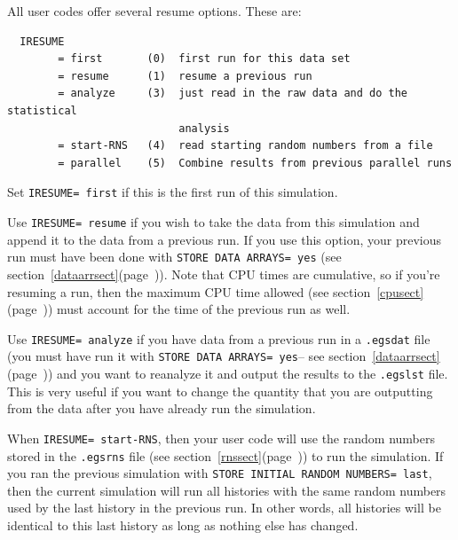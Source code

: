 \documentclass[12pt,twoside]{article}  %
\newcommand{\lpage}[1]{(page~\pageref{#1})}
\begin{document}
All user codes offer several resume options.  These are:

\begin{verbatim}
  IRESUME
        = first       (0)  first run for this data set
        = resume      (1)  resume a previous run
        = analyze     (3)  just read in the raw data and do the statistical
                           analysis
        = start-RNS   (4)  read starting random numbers from a file
        = parallel    (5)  Combine results from previous parallel runs
\end{verbatim}

Set {\tt IRESUME= first} if this is the first run of this simulation.

Use {\tt IRESUME= resume} if you wish to take the data from this simulation
and append it to the data from a previous run.  If you use this option, your
previous run must have been done with {\tt STORE DATA ARRAYS= yes}
(see section~\ref{dataarrsect}\lpage{dataarrsect}).  Note that CPU times
are cumulative, so if you're resuming a run, then the maximum CPU time
allowed (see section~\ref{cpusect}\lpage{cpusect}) must account for the time of
the previous run as well.

Use {\tt IRESUME= analyze} if you have data from a previous run in
a {\tt .egsdat} file (you must have run it with {\tt STORE DATA ARRAYS= yes}--
see section~\ref{dataarrsect}\lpage{dataarrsect}) and you want to reanalyze it and output
the results to the {\tt .egslst} file.  This is very useful if
you want to change the quantity that you are outputting from the data after
you have already run the simulation.

When {\tt IRESUME= start-RNS}, then your user code will use the
random numbers stored in the {\tt .egsrns} file (see
section~\ref{rnssect}\lpage{rnssect}) to run the simulation.  If you ran the previous simulation
with {\tt STORE INITIAL RANDOM NUMBERS= last}, then the current simulation
will run all histories with the same random numbers used by the last
history in the previous run.  In other words, all histories will be identical
to this last history as long as nothing else has changed.

\end{document}
